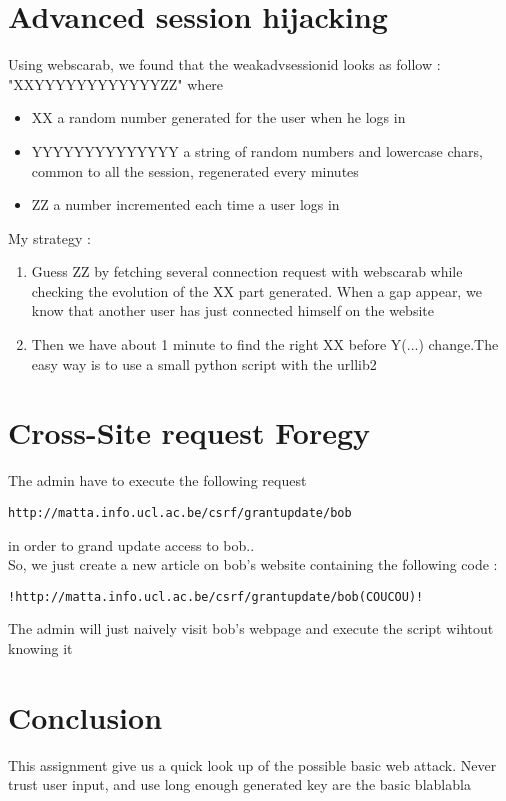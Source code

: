 \documentclass[10pt,a4paper]{article}
\begin{document}
\section{Advanced session hijacking}
Using webscarab, we found that the weakadvsessionid looks as follow : "XXYYYYYYYYYYYYZZ" where
\begin{itemize}
	\item{XX a random number generated for the user when he logs in}
	\item{YYYYYYYYYYYYYY a string of random numbers and lowercase chars, common to all the session, regenerated every minutes}
	\item{ZZ a number incremented each time a user logs in}
\end{itemize} 

My strategy : 
\begin{enumerate}
	\item{Guess ZZ by fetching several connection request with webscarab while checking the evolution of the XX part generated. When a gap appear, we know that another user has just connected himself on the website}
	\item{Then we have about 1 minute to find the right XX before Y(...) change.The easy way is to use a small python script with the urllib2}
\end{enumerate}

\section{Cross-Site request Foregy}
The admin have to execute the following request
\begin{lstlisting} 
http://matta.info.ucl.ac.be/csrf/grantupdate/bob
\end{lstlisting}
in order to grand update access to bob.. \\
So, we just create a new article on bob's website containing the following code : 
\begin{lstlisting} 
!http://matta.info.ucl.ac.be/csrf/grantupdate/bob(COUCOU)!
\end{lstlisting}
The admin will just naively visit bob's webpage and execute the script wihtout knowing it
\section{Conclusion}
This assignment give us a quick look up of the possible basic web attack. Never trust user input, and use long enough generated key are the basic blablabla
\end{document}
